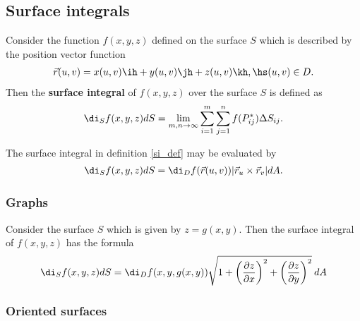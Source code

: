 \documentclass{article}
\begin{document}
\subsection{Surface integrals}


\begin{definition}
    \label{si_def}
    Consider the function $f(x,y,z)$ defined on the surface $S$ which is described by the
    position vector function
    \begin{align*}
        \vec r(u,v) = x(u,v)\ih + y(u,v)\jh + z(u,v)\kh,\hs (u,v)\in D.
    \end{align*}
    Then the \textbf{surface integral} of $f(x,y,z)$ over the surface $S$ is defined as
    \begin{align*}
        \di_S f(x,y,z)dS = \lim_{m,n\to\infty}\sum_{i=1}^m\sum_{j=1}^n f(P_{ij}^*)\Delta S_{ij}.
    \end{align*}
\end{definition}
\begin{theorem}
    The surface integral in definition \ref{si_def} may be evaluated by
    \begin{align*}
        \di_S f(x,y,z)dS = \di_D f(\vec r(u,v)) |\vec r_u\times \vec r_v|dA.
    \end{align*}
\end{theorem}

\subsubsection{Graphs}

\begin{theorem}
    Consider the surface $S$ which is given by $z=g(x,y)$. Then the surface integral
    of $f(x,y,z)$ has the formula
    \begin{align*}
        \di_S f(x,y,z)dS = \di_D f(x,y,g(x,y))\sqrt{1+\left(\frac{\partial z}{\partial x}\right)^2+\left(\frac{\partial z}{\partial y}\right)^2}\:dA
    \end{align*}
\end{theorem}

\subsubsection{Oriented surfaces}
\end{document}

